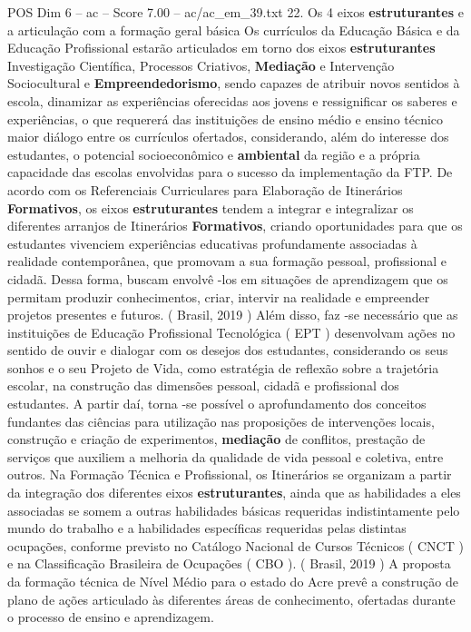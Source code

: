 \begin{textsample}{POS Dim 6 – ac – Score 7.00 – ac/ac\_em\_39.txt}  \label{ex:f6_pos_159}
22.
Os 4 eixos \textbf{estruturantes} e a articulação com a formação geral básica Os currículos da Educação Básica e da Educação Profissional estarão articulados em torno dos eixos \textbf{estruturantes} Investigação Científica, Processos Criativos, \textbf{Mediação} e Intervenção Sociocultural e \textbf{Empreendedorismo}, sendo capazes de atribuir novos sentidos à escola, dinamizar as experiências oferecidas aos jovens e ressignificar os saberes e experiências, o que requererá das instituições de ensino médio e ensino técnico maior diálogo entre os currículos ofertados, considerando, além do interesse dos estudantes, o potencial socioeconômico e \textbf{ambiental} da região e a própria capacidade das escolas envolvidas para o sucesso da implementação da FTP.
De acordo com os Referenciais Curriculares para Elaboração de Itinerários \textbf{Formativos}, os eixos \textbf{estruturantes} tendem a integrar e integralizar os diferentes arranjos de Itinerários \textbf{Formativos}, criando oportunidades para que os estudantes vivenciem experiências educativas profundamente associadas à realidade contemporânea, que promovam a sua formação pessoal, profissional e cidadã.
Dessa forma, buscam envolvê -los em situações de aprendizagem que os permitam produzir conhecimentos, criar, intervir na realidade e empreender projetos presentes e futuros. ( Brasil, 2019 ) Além disso, faz -se necessário que as instituições de Educação Profissional Tecnológica ( EPT ) desenvolvam ações no sentido de ouvir e dialogar com os desejos dos estudantes, considerando os seus sonhos e o seu Projeto de Vida, como estratégia de reflexão sobre a trajetória escolar, na construção das dimensões pessoal, cidadã e profissional dos estudantes.
A partir daí, torna -se possível o aprofundamento dos conceitos fundantes das ciências para utilização nas proposições de intervenções locais, construção e criação de experimentos, \textbf{mediação} de conflitos, prestação de serviços que auxiliem a melhoria da qualidade de vida pessoal e coletiva, entre outros.
Na Formação Técnica e Profissional, os Itinerários se organizam a partir da integração dos diferentes eixos \textbf{estruturantes}, ainda que as habilidades a eles associadas se somem a outras habilidades básicas requeridas indistintamente pelo mundo do trabalho e a habilidades específicas requeridas pelas distintas ocupações, conforme previsto no Catálogo Nacional de Cursos Técnicos ( CNCT ) e na Classificação Brasileira de Ocupações ( CBO ). ( Brasil, 2019 ) A proposta da formação técnica de Nível Médio para o estado do Acre prevê a construção de plano de ações articulado às diferentes áreas de conhecimento, ofertadas durante o processo de ensino e aprendizagem.

\end{textsample}
